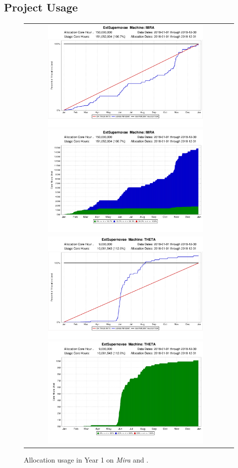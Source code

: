 \documentclass[12pt]{article}
\begin{document}
\subsection{Project Usage}

\begin{figure}
    \begin{tabular}{cc}
        \includegraphics[width=3.25in]{on_track_graph_mira_2018.png}
        \includegraphics[width=3.25in]{categorized_hours_graph_mira_2018.png} \\
        \includegraphics[width=3.25in]{on_track_graph_2018}
        \includegraphics[width=3.25in]{categorized_hours_graph_2018} 
    \end{tabular}
    \caption{Allocation usage in Year 1 on {\it Mira} and {\thet}.}
    \label{fig:usageY1}
\end{figure}
    
\end{document}
